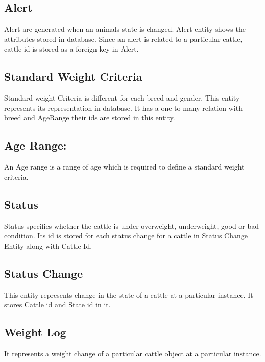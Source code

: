 \subsection{Alert}
Alert are generated when an animals state is changed. Alert entity shows the attributes stored in database. Since an alert is related to a particular cattle, cattle id is stored as a foreign key in Alert. 

\subsection{Standard Weight Criteria}
Standard weight Criteria is different for each breed and gender. This entity represents its representation in database. It has a one to many relation with breed and AgeRange their ids are stored in this entity. 


\subsection{Age Range:}
An Age range is a range of age which is required to define a standard weight criteria. 

\subsection{Status}
Status specifies whether the cattle is under overweight, underweight, good or bad condition. Its id is stored for each status change for a cattle in Status Change Entity along with Cattle Id.

\subsection{Status Change}
This entity represents change in the state of a cattle at a particular instance. It stores Cattle id and State id in it. 

\subsection{Weight Log}
It represents a weight change of a particular cattle object at a particular instance.



































